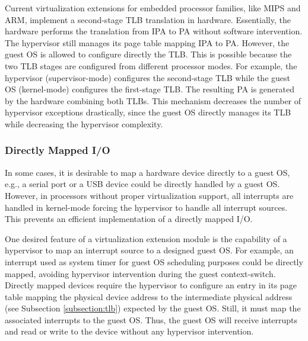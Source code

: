 Current virtualization extensions for embedded processor families, like MIPS and ARM, implement a second-stage TLB translation in hardware. Essentially, the hardware performs the translation from IPA to PA without software intervention. The hypervisor still manages its page table mapping IPA to PA. However, the guest OS is allowed to configure directly the TLB. This is possible because the two TLB stages are configured from different processor modes. For example, the hypervisor (supervisor-mode) configures the second-stage TLB while the guest OS (kernel-mode) configures the first-stage TLB. The resulting PA is generated by the hardware combining both TLBs. This mechanism decreases the number of hypervisor exceptions drastically, since the guest OS directly manages  its TLB while decreasing the hypervisor complexity. 




\subsubsection{Directly Mapped I/O}
\label{subsection:interrupt}

In some cases, it is desirable to map a hardware device directly to a guest OS, e.g., a serial port or a USB device could be directly handled by a guest OS. However, in processors without proper virtualization support, all interrupts are handled in kernel-mode forcing the hypervisor to handle all interrupt sources. This prevents an efficient implementation of a directly mapped I/O. 

One desired feature of a virtualization extension module is the capability of a hypervisor to map an interrupt source to a designed guest OS. For example, an interrupt used as system timer for guest OS scheduling purposes could be directly mapped, avoiding hypervisor intervention during the guest context-switch. Directly mapped devices require the hypervisor to configure an entry in its page table mapping the physical device address to the intermediate physical address (see Subsection \ref{subsection:tlb}) expected by the guest OS. Still, it must map the associated interrupts to the guest OS. Thus, the guest OS will receive  interrupts and read or write to the device without any hypervisor intervention. 


